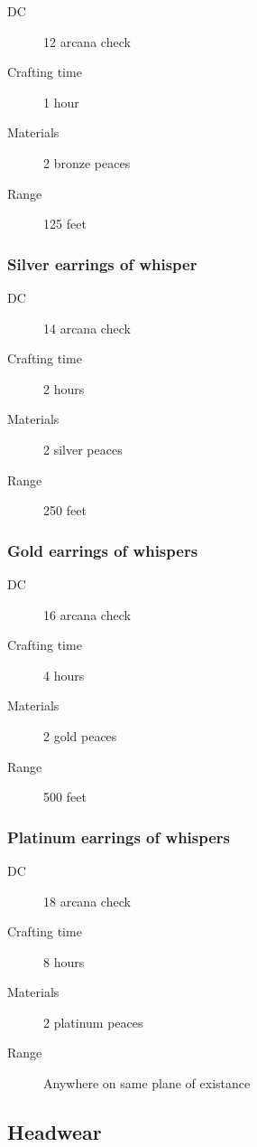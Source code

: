 \begin{description}
\item [DC] 12 arcana check
\item [Crafting time] 1 hour
\item [Materials] 2 bronze peaces
\item [Range] 125 feet
\end{description}

\subsubsection{Silver earrings of whisper}

\begin{description}
\item [DC] 14 arcana check
\item [Crafting time] 2 hours
\item [Materials] 2 silver peaces
\item [Range] 250 feet
\end{description}

\subsubsection{Gold earrings of whispers}

\begin{description}
\item [DC] 16 arcana check
\item [Crafting time] 4 hours
\item [Materials] 2 gold peaces
\item [Range] 500 feet
\end{description}

\subsubsection{Platinum earrings of whispers}

\begin{description}
\item [DC] 18 arcana check
\item [Crafting time] 8 hours
\item [Materials] 2 platinum peaces
\item [Range] Anywhere on same plane of existance
\end{description}

\subsection{Headwear}

